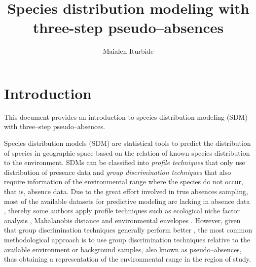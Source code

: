 \documentclass[10pt,a4paper]{article}
\begin{document}













\title{Species distribution modeling with three-step pseudo--absences}
\author{Maialen Iturbide}
\maketitle


\section{Introduction}
This document provides an introduction to species distribution modeling (SDM) with three--step pseudo--absences. 

Species distribution models (SDM) are statistical tools to predict the distribution of species in geographic space based on the relation of known species distribution to the environment. SDMs can be classified into \textit{profile techniques} that only use distribution of presence data and \textit{group discrimination techniques} that also require information of the environmental range where the species do not occur, that is, absence data. Due to the great effort involved in true absences sampling, most of the available datasets for predictive modeling are lacking in absence data \citep{zaniewski_predicting_2002, lobo_uncertain_2010}, thereby some authors apply profile techniques such as ecological niche factor analysis \citep[ENFA; i.e.][]{cianfrani_habitat_2010, mckinney_feeding_2012}, Mahalanobis distance \citep[MADIFA: i.e.][]{kuo_unexpected_2010, martin_brown_2012} and environmental envelopes \citep[BIOCLIM and DOMAIN: i.e.][]{giovanelli_modeling_2010, monk_habitat_2010}. However, given that group discrimination techniques generally perform better \citep{elith_novel_2006, engler_improved_2004, chefaoui_assessing_2008}, the most common  methodological approach is to use group discrimination techniques relative to the available environment or background samples, also known as pseudo--absences, thus obtaining a representation of the environmental range in the region of study. 
\end{document}
